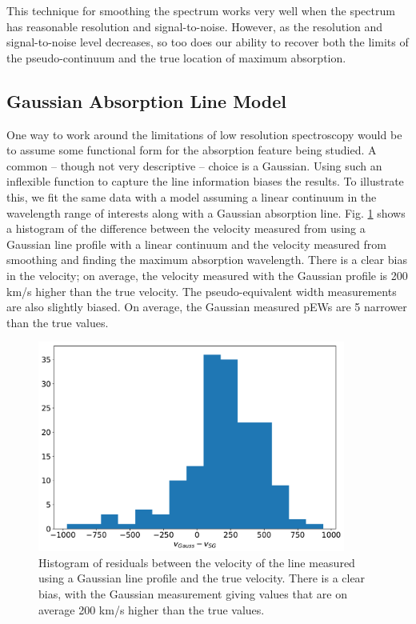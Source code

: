 

This technique for smoothing the spectrum works very well when the spectrum has reasonable resolution and signal-to-noise. However, as the resolution and signal-to-noise level decreases, so too does our ability to recover both the limits of the pseudo-continuum and the true location of maximum absorption. 

\subsection{Gaussian Absorption Line Model}
One way to work around the limitations of low resolution spectroscopy would be to assume some functional form for the absorption feature being studied. A common -- though not very descriptive -- choice is a Gaussian. Using such an inflexible function to capture the line information biases the results. To illustrate this, we fit the same data with a model assuming a linear continuum in the wavelength range of interests along with a Gaussian absorption line. Fig. \ref{gauss_bias} shows a histogram of the difference between the velocity measured from using a Gaussian line profile with a linear continuum and the velocity measured from smoothing and finding the maximum absorption wavelength. There is a clear bias in the velocity; on average, the velocity measured with the Gaussian profile is 200 km/s higher than the true velocity. The pseudo-equivalent width measurements are also slightly biased. On average, the Gaussian measured pEWs are 5 \angstrom\; narrower than the true values.

\begin{figure}[!htb]
    \centering
    \includegraphics[width=0.9\textwidth]{figures/si_feat_pca/gauss_bias.pdf}
    \caption{Histogram of residuals between the velocity of the \siliconii\; line measured using a Gaussian line profile and the true velocity. There is a clear bias, with the Gaussian measurement giving values that are on average 200 km/s higher than the true values.}
    \label{gauss_bias}
\end{figure}


